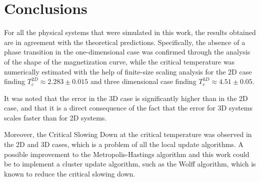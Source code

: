 \chapter{Conclusions}

For all the physical systems that were simulated in this work, the results obtained are in agreement with the theoretical predictions. Specifically, the absence of a phase transition in the one-dimensional case was confirmed through the analysis of the shape of the magnetization curve, while the critical temperature was numerically estimated with the help of finite-size scaling analysis for the 2D case finding $T_c^{2D} \approx 2.283 \pm 0.015$ and three dimensional case finding $T_c^{3D} \approx 4.51 \pm 0.05$.

It was noted that the error in the 3D case is significantly higher than in the 2D case, and that it is a direct consequence of the fact that the error for 3D systems scales faster than for 2D systems.

Moreover, the Critical Slowing Down at the critical temperature was observed in the 2D and 3D cases, which is a problem of all the local update algorithms. A possible improvement to the Metropolis-Hastings algorithm and this work could be to implement a cluster update algorithm, such as the Wolff algorithm, which is known to reduce the critical slowing down.

\clearpage